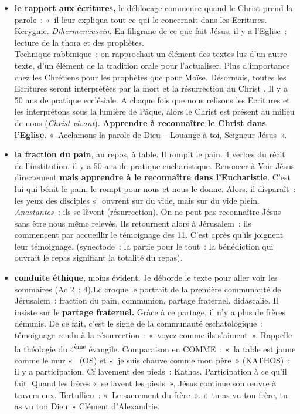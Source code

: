 \begin{itemize}
\item
  \textbf{le rapport aux écritures,} le déblocage commence quand le
  Christ prend la parole~: «~il leur expliqua tout ce qui le concernait
  dans les Ecritures. Kerygme. \emph{Dihermeneusein}. En filigrane de ce
  que fait Jésus, il y a l'Eglise~: lecture de la thora et des
  prophètes.\\
  Technique rabbinique~: on rapprochait un élément des textes lus d'un
  autre texte, d'un élément de la tradition orale pour l'actualiser.
  Plus d'importance chez les Chrétiens pour les prophètes que pour
  Moïse.
  Désormais, toutes les Ecritures seront interprétées par la mort et la
  résurrection du Christ . Il y a 50 ans de pratique ecclésiale. A
  chaque fois que nous relisons les Ecritures et les interprétons sous
  la lumière de Pâque, alors le Christ est présent au milieu de nous
  (\emph{Christ vivant}). \textbf{Apprendre à reconnaître le Christ dans
  l'Eglise.} «~Acclamons la parole de Dieu -- Louange à toi, Seigneur
  Jésus~».
\item
  \textbf{la fraction du pain}, au repos, à table. Il rompit le pain. 4
  verbes du récit de l'institution. il y a 50 ans de pratique
  eucharistique. Renoncer à Voir Jésus directement \textbf{mais
  apprendre à le reconnaître dans l'Eucharistie}. C'est lui qui bénit le
  pain, le rompt pour nous et nous le donne. Alors, il disparaît~: les
  yeux des disciples s'~ouvrent sur du vide, mais sur du vide plein.
  \emph{Anastantes~}: ils se lèvent (résurrection). On ne peut pas
  reconnaître Jésus sans être nous même relevés. Ils retournent alors à
  Jérusalem~: ils commencent par accueillir le témoignage des 11. C'est
  après qu'ils joignent leur témoignage. (synectode~: la partie pour le
  tout~: la bénédiction qui ouvrait le repas signifiant la totalité du
  repas).
\item
  \textbf{conduite éthique}, moins évident. Je déborde le texte pour
  aller voir les sommaires (Ac 2~; 4).Lc croque le portrait de la
  première communauté de Jérusalem~: fraction du pain, communion,
  partage fraternel, didascalie. Il insiste sur le \textbf{partage
  fraternel.} Grâce à ce partage, il n'y a plus de frères démunis. De ce
  fait, c'est le signe de la communauté eschatologique~: témoignage
  rendu à la résurrection~: «~voyez comme ils s'aiment~». Rappelle la théologie du 4\textsuperscript{ème} évangile.
  Comparaison en COMME~: «~la table est jaune comme le mur «~ (OS) et
  «~je suis chauve comme mon père~» (KATHOS)~: il y a participation. Cf
  lavement des pieds~: Kathos. Participation à ce qu'il fait. Quand les
  frères «~se lavent les pieds~», Jésus continue son œuvre à travers
  eux. Tertullien~: «~Le sacrement du frère~». «~tu as vu ton frère, tu
  as vu ton Dieu~» Clément d'Alexandrie.
\end{itemize}

